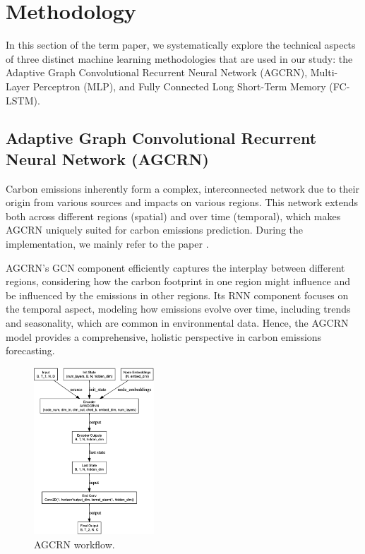 \documentclass[sigconf, authordraft]{acmart}
\begin{document}
\section{Methodology}

In this section of the term paper, we systematically explore the technical aspects of three distinct machine learning methodologies that are used in our study: the Adaptive Graph Convolutional Recurrent Neural Network (AGCRN), Multi-Layer Perceptron (MLP), and Fully Connected Long Short-Term Memory (FC-LSTM).

\subsection{Adaptive Graph Convolutional Recurrent Neural Network (AGCRN)}

Carbon emissions inherently form a complex, interconnected network due to their origin from various sources and impacts on various regions. This network extends both across different regions (spatial) and over time (temporal), which makes AGCRN uniquely suited for carbon emissions prediction. During the implementation, we mainly refer to the paper \cite{bai2020-adaptivea}.

AGCRN's GCN component efficiently captures the interplay between different regions, considering how the carbon footprint in one region might influence and be influenced by the emissions in other regions. Its RNN component focuses on the temporal aspect, modeling how emissions evolve over time, including trends and seasonality, which are common in environmental data. Hence, the AGCRN model provides a comprehensive, holistic perspective in carbon emissions forecasting.

\begin{figure}[ht]
	\centering
	\includegraphics[width=0.4\textwidth]{figures/AGCRN_flow.png}
	\caption{AGCRN workflow.}
	\label{fig:AGCRN_flow}
\end{figure}
\end{document}
